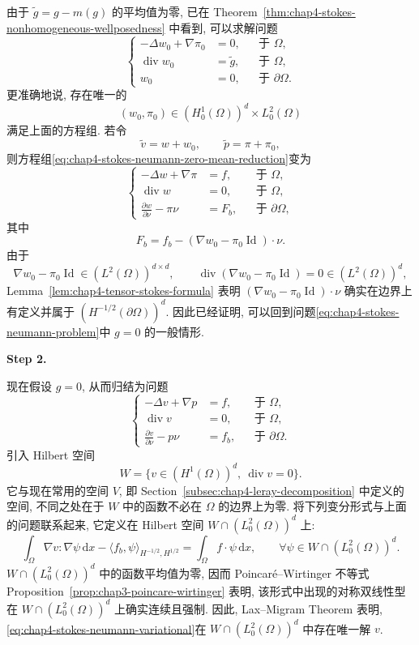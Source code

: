 \begin{Proof}
由于 $\widetilde g=g-m(g)$ 的平均值为零, 已在 Theorem~\ref{thm:chap4-stokes-nonhomogeneous-wellposedness} 中看到, 可以求解问题
\[
 \left\{
 \begin{aligned}
  -\Delta w_0+\nabla\pi_0&=0,&&\text{于 }\Omega,\\
  \operatorname{div}w_0&=\widetilde g,&&\text{于 }\Omega,\\
  w_0&=0,&&\text{于 }\partial\Omega.
 \end{aligned}
 \right.
\]
更准确地说, 存在唯一的
\[
 (w_0,\pi_0)\in(H_0^1(\Omega))^d\times L_0^2(\Omega)
\]
满足上面的方程组. 若令
\[
 \widetilde v=w+w_0,\qquad\widetilde p=\pi+\pi_0,
\]
则方程组\eqref{eq:chap4-stokes-neumann-zero-mean-reduction}变为
\[
 \left\{
 \begin{aligned}
  -\Delta w+\nabla\pi&=f,&&\text{于 }\Omega,\\
  \operatorname{div}w&=0,&&\text{于 }\Omega,\\
  \frac{\partial w}{\partial\nu}-\pi\nu&=F_b,&&\text{于 }\partial\Omega,
 \end{aligned}
 \right.
\]
其中
\[
 F_b=f_b-(\nabla w_0-\pi_0\operatorname{Id})\cdot\nu.
\]
由于
\[
 \nabla w_0-\pi_0\operatorname{Id}\in(L^2(\Omega))^{d\times d},
 \qquad
 \operatorname{div}(\nabla w_0-\pi_0\operatorname{Id})=0\in(L^2(\Omega))^d,
\]
Lemma~\ref{lem:chap4-tensor-stokes-formula} 表明 $(\nabla w_0-\pi_0\operatorname{Id})\cdot\nu$ 确实在边界上有定义并属于 $(H^{-1/2}(\partial\Omega))^d$. 因此已经证明, 可以回到问题\eqref{eq:chap4-stokes-neumann-problem}中 $g=0$ 的一般情形.

\textbf{Step 2.}

现在假设 $g=0$, 从而归结为问题
\[
 \left\{
 \begin{aligned}
  -\Delta v+\nabla p&=f,&&\text{于 }\Omega,\\
  \operatorname{div}v&=0,&&\text{于 }\Omega,\\
  \frac{\partial v}{\partial\nu}-p\nu&=f_b,&&\text{于 }\partial\Omega.
 \end{aligned}
 \right.
\]
引入 Hilbert 空间
\[
 W=\{v\in(H^1(\Omega))^d,\ \operatorname{div}v=0\}.
\]
它与现在常用的空间 $V$, 即 Section~\ref{subsec:chap4-leray-decomposition} 中定义的空间, 不同之处在于 $W$ 中的函数不必在 $\Omega$ 的边界上为零. 将下列变分形式与上面的问题联系起来, 它定义在 Hilbert 空间 $W\cap(L_0^2(\Omega))^d$ 上:
\begin{equation}
 \int_\Omega\nabla v:\nabla\psi\,\mathrm dx
 -\langle f_b,\psi\rangle_{H^{-1/2},H^{1/2}}
 =\int_\Omega f\cdot\psi\,\mathrm dx,
 \qquad\forall\psi\in W\cap(L_0^2(\Omega))^d.
 \label{eq:chap4-stokes-neumann-variational}
\end{equation}
$W\cap(L_0^2(\Omega))^d$ 中的函数平均值为零, 因而 Poincaré--Wirtinger 不等式 Proposition~\ref{prop:chap3-poincare-wirtinger} 表明, 该形式中出现的对称双线性型在 $W\cap(L_0^2(\Omega))^d$ 上确实连续且强制. 因此, Lax--Migram Theorem 表明, \eqref{eq:chap4-stokes-neumann-variational}在 $W\cap(L_0^2(\Omega))^d$ 中存在唯一解 $v$.


\end{Proof}
